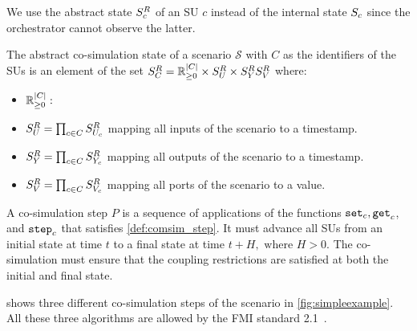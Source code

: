 We use the abstract state $S^{R}_{c}$ of an SU $c$ instead of the internal state $S_{c}$ since the orchestrator cannot observe the latter.

\begin{definition}\label{def:cosimstate}
  The abstract co-simulation state of a scenario $\mathcal{S}$ with $C$ as the identifiers of the SUs is an element of the set $S^{R}_{C} = \mathbb{R}_{\geq 0}^{\mid C \mid} \times S^{R}_{U} \times S^{R}_{Y} S^{R}_{V}$
  where:
  \begin{itemize}
    \item $\mathbb{R}_{\geq 0}^{\mid C \mid} : $
    \item $S^{R}_{U} = \prod_{c \in C} S^{R}_{U_{c}}$ mapping all inputs of the scenario to a timestamp. 
    \item $S^{R}_{Y} = \prod_{c \in C} S^{R}_{Y_{c}}$ mapping all outputs of the scenario to a timestamp. 
    \item $S^{R}_{V} =  \prod_{c \in C} S^{R}_{V_c}$ mapping all ports of the scenario to a value. 
  \end{itemize}
\end{definition}

A co-simulation step $P$ is a sequence of applications of the functions $\mathtt{set}_{c},\mathtt{get}_{c}$, and $\mathtt{step}_{c}$ that satisfies \cref{def:comsim_step}.
It must advance all SUs from an initial state at time $t$ to a final state at time $t+H, \textrm{ where } H > 0$.
The co-simulation must ensure that the coupling restrictions are satisfied at both the initial and final state.

 shows three different co-simulation steps of the scenario in \cref{fig:simpleexample}.
All these three algorithms are allowed by the FMI standard 2.1~\cite{FMI2014}. 

